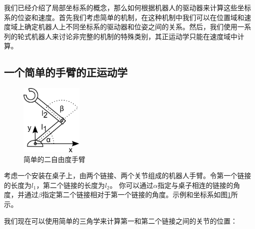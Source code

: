 我们已经介绍了局部坐标系的概念，那么如何根据机器人的驱动器来计算这些坐标系的位姿和速度。首先我们考虑简单的机制，在这种机制中我们可以在位置域和速度域上确定机器人上不同坐标系的驱动器和位姿之间的关系。然后，我们使用一系列的轮式机器人来讨论非完整的机制的特殊类别，其正运动学只能在速度域中计算。

\subsection{一个简单的手臂的正运动学}
\begin{figure}[!htb]%
  \begin{center}
    \includegraphics[width=0.27\textwidth]{figs/fwk2dofarm}
  \end{center}
  \caption{简单的二自由度手臂}
  \label{fig:fwk2dofarm}
\end{figure}


考虑一个安装在桌子上，由两个链接、两个关节组成的机器人手臂。令第一个链接的长度为$l_1$，第二个链接的长度为$l_2$。 你可以通过$\alpha$指定与桌子相连的链接的角度，并通过$\beta$指定第二个链接相对于第一个链接的角度。示例和坐标系如图\ref{fig:fwk2dofarm}所示。


我们现在可以使用简单的三角学来计算第一和第二个链接之间的关节的位置：

